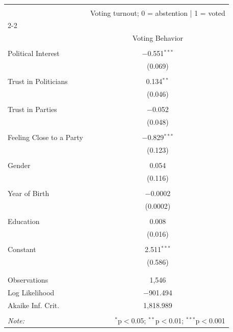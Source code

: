 
\begin{table}[!htbp] \centering 
  \caption{} 
  \label{} 
\begin{tabular}{@{\extracolsep{5pt}}lc} 
\\[-1.8ex]\hline 
\hline \\[-1.8ex] 
 & \multicolumn{1}{c}{Voting turnout; 0 = abstention | 1 = voted} \\ 
\cline{2-2} 
\\[-1.8ex] & Voting Behavior \\ 
\hline \\[-1.8ex] 
 Political Interest & $-$0.551$^{***}$ \\ 
  & (0.069) \\ 
  & \\ 
 Trust in Politicians & 0.134$^{**}$ \\ 
  & (0.046) \\ 
  & \\ 
 Trust in Parties & $-$0.052 \\ 
  & (0.048) \\ 
  & \\ 
 Feeling Close to a Party & $-$0.829$^{***}$ \\ 
  & (0.123) \\ 
  & \\ 
 Gender & 0.054 \\ 
  & (0.116) \\ 
  & \\ 
 Year of Birth & $-$0.0002 \\ 
  & (0.0002) \\ 
  & \\ 
 Education & 0.008 \\ 
  & (0.016) \\ 
  & \\ 
 Constant & 2.511$^{***}$ \\ 
  & (0.586) \\ 
  & \\ 
\hline \\[-1.8ex] 
Observations & 1,546 \\ 
Log Likelihood & $-$901.494 \\ 
Akaike Inf. Crit. & 1,818.989 \\ 
\hline 
\hline \\[-1.8ex] 
\textit{Note:}  & \multicolumn{1}{r}{$^{*}$p$<$0.05; $^{**}$p$<$0.01; $^{***}$p$<$0.001} \\ 
\end{tabular} 
\end{table} 
